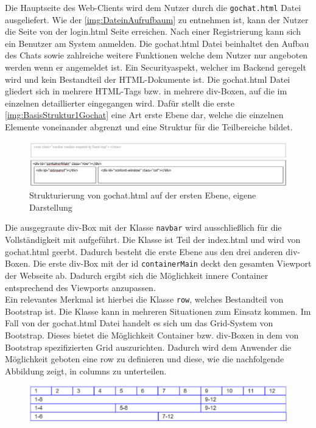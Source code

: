 \documentclass[a4paper,titlepage,halfparskip,12pt]{scrreprt}
\begin{document}
\begin{onehalfspacing}
Die Hauptseite des Web-Clients wird dem Nutzer durch die \texttt{gochat.html} Datei ausgeliefert. Wie der \autoref{img:DateinAufrufbaum} zu entnehmen ist, kann der Nutzer die Seite von der login.html Seite erreichen. Nach einer Registrierung kann sich ein Benutzer am System anmelden. Die gochat.html Datei beinhaltet den Aufbau des Chats sowie zahlreiche weitere Funktionen welche dem Nutzer nur angeboten werden wenn er angemeldet ist. Ein Securityaspekt, welcher im Backend geregelt wird und kein Bestandteil der HTML-Dokumente ist. Die gochat.html Datei gliedert sich in mehrere HTML-Tags bzw. in mehrere div-Boxen, auf die im einzelnen detaillierter eingegangen wird. Dafür stellt die erste \autoref{img:BasisStruktur1Gochat} eine Art erste Ebene dar, welche die einzelnen Elemente voneinander abgrenzt und eine Struktur für die Teilbereiche bildet.
\begin{figure}[h]
	\centering
	\includegraphics[width=\linewidth]{images/BasisStruktur1Gochat}
	\caption{Strukturierung von gochat.html auf der ersten Ebene, eigene Darstellung}
	\label{img:BasisStruktur1Gochat}
\end{figure}
Die ausgegraute div-Box mit der Klasse \texttt{navbar} wird ausschließlich für die Vollständigkeit mit aufgeführt. Die Klasse ist Teil der index.html und wird von gochat.html geerbt. Dadurch besteht die erste Ebene aus den drei anderen div-Boxen. Die erste div-Box mit der id \texttt{containerMain} deckt den gesamten Viewport der Webseite ab. Dadurch ergibt sich die Möglichkeit innere Container entsprechend des Viewports anzupassen.\\
Ein relevantes Merkmal ist hierbei die Klasse \texttt{row}, welches Bestandteil von Bootstrap ist. Die Klasse kann in mehreren Situationen zum Einsatz kommen. Im Fall von der gochat.html Datei handelt es sich um das Grid-System von Bootstrap. Dieses bietet die Möglichkeit Container bzw. div-Boxen in dem von Bootstrap spezifizierten Grid auszurichten. Dadurch wird dem Anwender die Möglichkeit geboten eine row zu definieren und diese, wie die nachfolgende Abbildung zeigt, in columns zu unterteilen.
\begin{figure}[h]
	\centering
	\includegraphics[scale=0.9]{images/GridSystem}

\end{figure}
\end{onehalfspacing}
\end{document}
